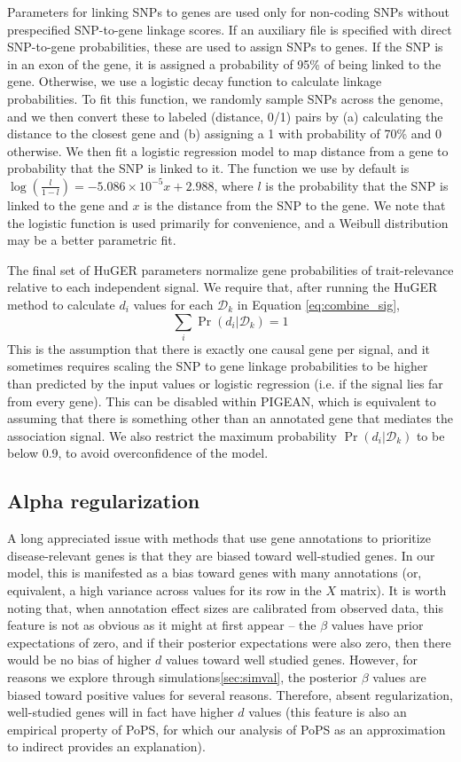 \documentclass[11pt]{article}
\begin{document}
{Parameters for linking SNPs to genes are used only for non-coding SNPs
without prespecified SNP-to-gene linkage scores\cite{}. If an
auxiliary file is specified with direct SNP-to-gene probabilities,
these are used to assign SNPs to genes. If the SNP is in an exon of
the gene, it is assigned a probability of 95\% of being linked to the
gene. Otherwise, we use a logistic decay function to calculate linkage
probabilities. To fit this function, we randomly sample SNPs across
the genome, and we then convert these to labeled (distance, 0/1) pairs
by (a) calculating the distance to the closest gene and (b) assigning
a 1 with probability of 70\% and 0 otherwise. We then fit a logistic
regression model to map distance from a gene to probability that the
SNP is linked to it. The function we use by default is
$\log\left(\frac{l}{1-l}\right) = -5.086\times
10^{-5}x + 2.988$, where $l$ is the probability that the SNP is linked
to the gene and $x$ is the distance from the SNP to the gene. We note
that the logistic function is used primarily for convenience, and a
Weibull distribution may be a better parametric fit\cite{}.

The final set of HuGER parameters normalize gene probabilities of
trait-relevance relative to each independent signal. We require that,
after running the HuGER method to calculate $d_i$ values for each
$\mathcal{D}_k$ in Equation \eqref{eq:combine_sig},
\[\sum_i\Pr\left(d_i|\mathcal{D}_k\right) = 1\]
This is the assumption that there is exactly one causal gene per
signal, and it sometimes requires scaling the SNP to gene linkage
probabilities to be higher than predicted by the input values or
logistic regression (i.e. if the signal lies far from every
gene). This can be disabled within PIGEAN, which is equivalent to
assuming that there is something other than an annotated gene that
mediates the association signal. We also restrict the maximum
probability $\Pr\left(d_i|\mathcal{D}_k\right)$ to be below 0.9, to
avoid overconfidence of the model.

\subsection{Alpha regularization}

A long appreciated issue with methods that use gene annotations to
prioritize disease-relevant genes is that they are biased toward
well-studied genes. In our model, this is manifested as a bias toward
genes with many annotations (or, equivalent, a high variance across
values for its row in the
$X$ matrix). It is worth noting that, when annotation effect sizes are
calibrated from observed data, this feature is not as obvious as it
might at first appear -- the $\beta$ values have prior expectations of
zero, and if their posterior expectations were also zero, then there
would be no bias of higher $d$ values toward well studied
genes. However, for reasons we explore through
simulations\ref{sec:simval}, the posterior $\beta$ values are biased
toward positive values for several reasons. Therefore, absent
regularization, well-studied genes will in fact have higher $d$ values
(this feature is also an empirical property of PoPS, for which our
analysis of PoPS as an approximation to indirect provides an
explanation).

}
\end{document}

